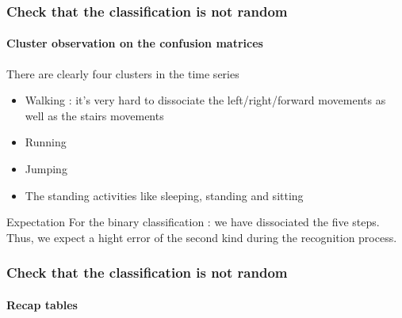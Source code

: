 \documentclass[11pt, sans]{beamer}
\begin{document}
\begin{frame}
\frametitle{Check that the classification is not random}
\framesubtitle{Cluster observation on the confusion matrices}

\begin{alertblock}{There are clearly four clusters in the time series}
\begin{itemize}
	\item Walking : it's very hard to dissociate the left/right/forward movements as well as the stairs movements
	\item Running
	\item Jumping
	\item The standing activities like sleeping, standing and sitting 
\end{itemize}

\end{alertblock}
\begin{exampleblock}{Expectation}
For the binary classification : we have dissociated the five steps. Thus, we expect a hight error of the second kind during the recognition process.
\end{exampleblock}
\end{frame}
	
\begin{frame}
\frametitle{Check that the classification is not random}
\framesubtitle{Recap tables}

\begin{overprint}
	 
\end{overprint}	        

\end{frame}
\end{document}
